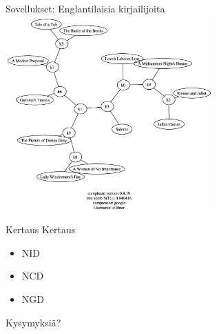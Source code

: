 \documentclass{beamer}
\begin{document}
\begin{frame}{Sovellukset: Englantilaisia kirjailijoita}
  \centering
  \includegraphics[width=8cm,keepaspectratio=true]{google-002}
\end{frame}

\begin{frame}{Kertaus}
  Kertaus
  \begin{itemize}
    \item NID
    \item NCD
    \item NGD
  \end{itemize}
\end{frame}

\begin{frame}
  \centering
  Kysymyksiä?
\end{frame}
\end{document}
